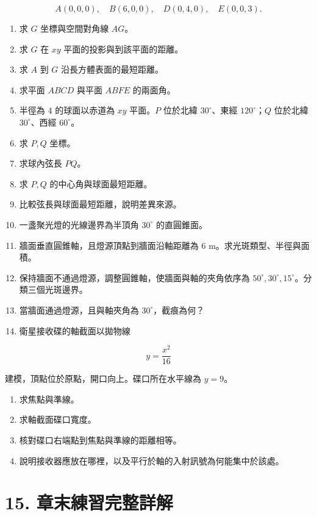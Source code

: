 \documentclass[11pt,a4paper]{article}
\providecommand{\tightlist}{%
  \setlength{\itemsep}{0pt}\setlength{\parskip}{0pt}}
\begin{document}
\[
A(0,0,0),\quad B(6,0,0),\quad D(0,4,0),\quad E(0,0,3).
\]

\begin{enumerate}
\def\labelenumi{\arabic{enumi}.}
\item
  求 \(G\) 坐標與空間對角線 \(AG\)。
\item
  求 \(G\) 在 \(xy\) 平面的投影與到該平面的距離。
\item
  求 \(A\) 到 \(G\) 沿長方體表面的最短距離。
\item
  求平面 \(ABCD\) 與平面 \(ABFE\) 的兩面角。
\item
  半徑為 \(4\) 的球面以赤道為 \(xy\) 平面。\(P\) 位於北緯 \(30^\circ\)、東經 \(120^\circ\)；\(Q\) 位於北緯 \(30^\circ\)、西經 \(60^\circ\)。
\item
  求 \(P,Q\) 坐標。
\item
  求球內弦長 \(PQ\)。
\item
  求 \(P,Q\) 的中心角與球面最短距離。
\item
  比較弦長與球面最短距離，說明差異來源。
\item
  一盞聚光燈的光線邊界為半頂角 \(30^\circ\) 的直圓錐面。
\item
  牆面垂直圓錐軸，且燈源頂點到牆面沿軸距離為 \(6\text{ m}\)。求光斑類型、半徑與面積。
\item
  保持牆面不通過燈源，調整圓錐軸，使牆面與軸的夾角依序為 \(50^\circ,30^\circ,15^\circ\)。分類三個光斑邊界。
\item
  當牆面通過燈源，且與軸夾角為 \(30^\circ\)，截痕為何？
\item
  衛星接收碟的軸截面以拋物線
\end{enumerate}

\[
y=\frac{x^2}{16}
\]

建模，頂點位於原點，開口向上。碟口所在水平線為 \(y=9\)。

\begin{enumerate}
\def\labelenumi{\arabic{enumi}.}
\tightlist
\item
  求焦點與準線。
\item
  求軸截面碟口寬度。
\item
  核對碟口右端點到焦點與準線的距離相等。
\item
  說明接收器應放在哪裡，以及平行於軸的入射訊號為何能集中於該處。
\end{enumerate}

\section{15. 章末練習完整詳解}\label{ux7ae0ux672bux7df4ux7fd2ux5b8cux6574ux8a73ux89e3}
\end{document}
